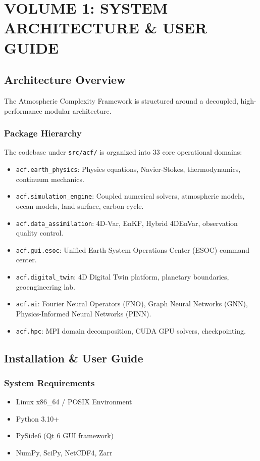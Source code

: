 \documentclass[11pt,a4paper,oneside]{report}
\begin{document}
\part{VOLUME 1: SYSTEM ARCHITECTURE \& USER GUIDE}

\chapter{Architecture Overview}
The Atmospheric Complexity Framework is structured around a decoupled, high-performance modular architecture.

\section{Package Hierarchy}
The codebase under \texttt{src/acf/} is organized into 33 core operational domains:
\begin{itemize}
    \item \texttt{acf.earth\_physics}: Physics equations, Navier-Stokes, thermodynamics, continuum mechanics.
    \item \texttt{acf.simulation\_engine}: Coupled numerical solvers, atmospheric models, ocean models, land surface, carbon cycle.
    \item \texttt{acf.data\_assimilation}: 4D-Var, EnKF, Hybrid 4DEnVar, observation quality control.
    \item \texttt{acf.gui.esoc}: Unified Earth System Operations Center (ESOC) command center.
    \item \texttt{acf.digital\_twin}: 4D Digital Twin platform, planetary boundaries, geoengineering lab.
    \item \texttt{acf.ai}: Fourier Neural Operators (FNO), Graph Neural Networks (GNN), Physics-Informed Neural Networks (PINN).
    \item \texttt{acf.hpc}: MPI domain decomposition, CUDA GPU solvers, checkpointing.
\end{itemize}

\chapter{Installation \& User Guide}
\section{System Requirements}
\begin{itemize}
    \item Linux x86\_64 / POSIX Environment
    \item Python 3.10+
    \item PySide6 (Qt 6 GUI framework)
    \item NumPy, SciPy, NetCDF4, Zarr
\end{itemize}
\end{document}
